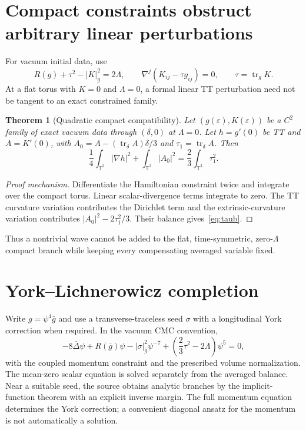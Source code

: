\documentclass[11pt,a4paper,oneside]{book}
\theoremstyle{plain}
\newtheorem{theorem}{Theorem}[chapter]
\theoremstyle{definition}
\theoremstyle{remark}
\newcommand{\tr}{\operatorname{tr}}
\newcommand{\src}[2]{\cite{#1}}
\begin{document}
\section{Compact constraints obstruct arbitrary linear perturbations}
For vacuum initial data, use
\begin{equation}
 R(g)+\tau^2-|K|_g^2=2\Lambda,
 \qquad\nabla^j(K_{ij}-\tau g_{ij})=0,
 \qquad\tau=\tr_gK.
 \label{eq:adm-constraints}
\end{equation}
At a flat torus with $K=0$ and $\Lambda=0$, a formal linear TT perturbation need not be tangent to an exact constrained family.

\begin{theorem}[Quadratic compact compatibility]
\label{thm:taub}
Let $(g(\varepsilon),K(\varepsilon))$ be a $C^2$ family of exact vacuum data through $(\delta,0)$ at $\Lambda=0$. Let $h=g'(0)$ be TT and $A=K'(0)$, with $A_0=A-(\tr_\delta A)\delta/3$ and $\tau_1=\tr_\delta A$. Then
\begin{equation}
 \frac14\int_{\mathbb T^3}|\nabla h|^2
 +\int_{\mathbb T^3}|A_0|^2
 =\frac23\int_{\mathbb T^3}\tau_1^2.
 \label{eq:taub}
\end{equation}
\end{theorem}
\begin{proof}[Proof mechanism]
Differentiate the Hamiltonian constraint twice and integrate over the compact torus. Linear scalar-divergence terms integrate to zero. The TT curvature variation contributes the Dirichlet term and the extrinsic-curvature variation contributes $|A_0|^2-2\tau_1^2/3$. Their balance gives~\eqref{eq:taub}.
\end{proof}
\src{R19}{thm:v19v26-taub}
Thus a nontrivial wave cannot be added to the flat, time-symmetric, zero-$\Lambda$ compact branch while keeping every compensating averaged variable fixed.

\section{York--Lichnerowicz completion}
Write $g=\psi^4\bar g$ and use a transverse-traceless seed $\sigma$ with a longitudinal York correction when required. In the vacuum CMC convention,
\begin{equation}
 -8\bar\Delta\psi+R(\bar g)\psi
 -|\sigma|_{\bar g}^2\psi^{-7}
 +\left(\frac23\tau^2-2\Lambda\right)\psi^5=0,
 \label{eq:lichnerowicz}
\end{equation}
with the coupled momentum constraint and the prescribed volume normalization. The mean-zero scalar equation is solved separately from the averaged balance. Near a suitable seed, the source obtains analytic branches by the implicit-function theorem with an explicit inverse margin. The full momentum equation determines the York correction; a convenient diagonal ansatz for the momentum is not automatically a solution. \cite{R19}
\end{document}
